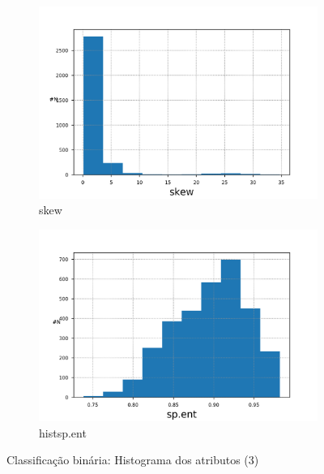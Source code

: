 \documentclass{article}
\begin{document}
        \begin{figure}[H]
            \begin{subfigure}{.5\textwidth}
                \centering
                \includegraphics[width=.8\linewidth]{img1/data_histskew.png}
                \caption{skew}
            \end{subfigure}
            \begin{subfigure}{.5\textwidth}
                \centering
                \includegraphics[width=.8\linewidth]{img1/data_histsp_ent.png}
                \caption{histsp.ent}
            \end{subfigure}
        \caption{Classificação binária: Histograma dos atributos (3)}
        \label{fig:a_hist_3}
        \end{figure}
\end{document}
